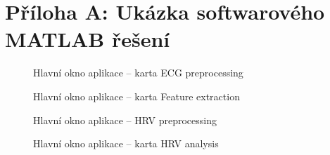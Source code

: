 \section*{Příloha A: Ukázka softwarového MATLAB řešení}
\label{app:pozadavky}

\begin{figure}[H]
    \begin{center}
        \textcolor{cyan}{\fboxrule=0.3pt\fboxsep=0pt}
        \caption{Hlavní okno aplikace -- karta ECG preprocessing}
        \label{fig:results_matlab_tab1}
    \end{center}
\end{figure}

\begin{figure}[H]
    \begin{center}
        \textcolor{cyan}{\fboxrule=0.3pt\fboxsep=0pt}
        \caption{Hlavní okno aplikace -- karta Feature extraction}
        \label{fig:results_matlab_tab2}
    \end{center}
\end{figure}

\begin{figure}[H]
    \begin{center}
        \textcolor{cyan}{\fboxrule=0.3pt\fboxsep=0pt}
        \caption{Hlavní okno aplikace -- HRV preprocessing}
        \label{fig:results_matlab_tab3}
    \end{center}
\end{figure}

\begin{figure}[H]
    \begin{center}
        \textcolor{cyan}{\fboxrule=0.3pt\fboxsep=0pt}
        \caption{Hlavní okno aplikace -- karta HRV analysis}
        \label{fig:results_matlab_tab4_}
    \end{center}
\end{figure}

\clearpage


